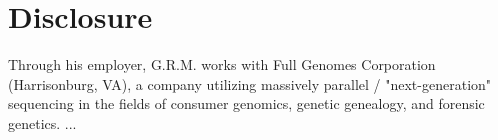 \documentclass{article}
\begin{document}
\section{Disclosure}
Through his employer, G.R.M. works with Full Genomes Corporation (Harrisonburg, VA), a company utilizing massively parallel / "next-generation" sequencing in the fields of consumer genomics, genetic genealogy, and forensic genetics.
...



\end{document}
